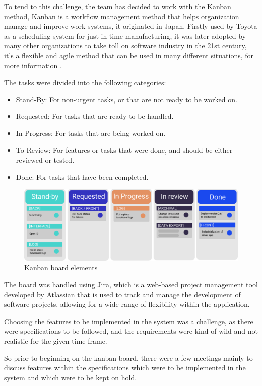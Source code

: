 To tend to this challenge, the team has decided to work with the
Kanban method, Kanban is a workflow management method that helps organization
manage and improve work systems, it originated in Japan. Firstly used by Toyota
as a scheduling system for just-in-time manufacturing, it was later adopted by
many other organizations to take toll on software industry in the 21st century, 
it's a flexible and agile method that can be used in many different situations,
for more information \cite{kanban_def}.


The tasks were divided into the following categories:
\begin{itemize}
    \item Stand-By: For non-urgent tasks, or that are not ready to be worked on.
    \item Requested: For tasks that are ready to be handled.
    \item In Progress: For tasks that are being worked on.
    \item To Review: For features or tasks that were done,
        and should be either reviewed or tested.
    \item Done: For tasks that have been completed.
\end{itemize}

\begin{figure}[!htpb]
    \centering
    \includegraphics[width=\textwidth]{images/kanban_mod.png}
    \caption{Kanban board elements}
    \label{fig:kanban-board-elements}
\end{figure}

The board was handled using Jira, which is a web-based project management tool developed
by Atlassian that is used to track and manage the development of software projects,
allowing for a wide range of flexibility within the application.

Choosing the features to be implemented in the system was a challenge,
as there were specifications to be followed, and the requirements were
kind of wild and not realistic for the given time frame.

So prior to beginning on the kanban board, there were a few meetings 
mainly to discuss features within the specifications which were to be implemented 
in the system and which were to be kept on hold.


